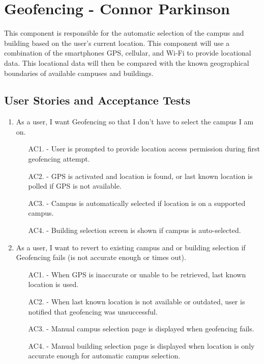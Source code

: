 \documentclass{scrreprt}
\begin{document}
\pagebreak

\section{Geofencing - Connor Parkinson}

This component is responsible for the automatic selection of the campus and building based on the user’s current location. This component will use a combination of the smartphones GPS, cellular, and Wi-Fi to provide locational data. This locational data will then be compared with the known geographical boundaries of available campuses and buildings.


\subsection{User Stories and Acceptance Tests}

\begin{enumerate}
	\item As a user, I want Geofencing so that I don't have to select the campus I am on.
	
		\begin{itemize}
			\item [AC1.] - User is prompted to provide location access permission during first geofencing attempt.
			\item [AC2.] - GPS is activated and location is found, or last known location is polled if GPS is not available.
			\item [AC3.] - Campus is automatically selected if location is on a supported campus.
			\item [AC4.] - Building selection screen is shown if campus is auto-selected.

		\end{itemize}
	
	\item As a user, I want to revert to existing campus and or building selection if Geofencing fails (is not accurate enough or times out).
	
		\begin{itemize}
			\item [AC1.] - When GPS is inaccurate or unable to be retrieved, last known location is used.
			
			\item [AC2.] - When last known location is not available or outdated, user is notified that geofencing was unsuccessful.
			
			\item [AC3.] - Manual campus selection page is displayed when geofencing fails.
			
			\item [AC4.] - Manual building selection page is displayed when location is only accurate enough for automatic campus selection.
		\end{itemize}
\end{enumerate}
\end{document}
